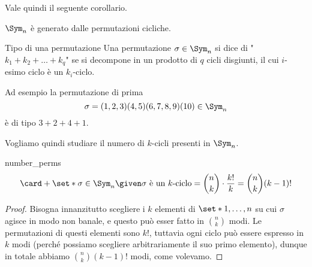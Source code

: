 Vale quindi il seguente corollario.

\begin{corollary}{}{}
    $\Sym_n$ è generato dalle permutazioni cicliche.
\end{corollary}


\begin{definition}
    {Tipo di una permutazione}{}
    Una permutazione $\sigma \in \Sym_n$ si dice di  "$k_1 + k_2 + \dots + k_q$" se si decompone in un prodotto di $q$ cicli disgiunti, il cui $i$-esimo ciclo è un $k_i$-ciclo. 
\end{definition}

Ad esempio la permutazione di prima \[
    \sigma = (1, 2, 3)(4, 5)(6, 7, 8, 9)(10) \in \Sym_n
\] è di tipo $3 + 2 + 4 + 1$.

Vogliamo quindi studiare il numero di $k$-cicli presenti in $\Sym_n$.

\begin{proposition}
    {}{number_perms}
    \[
        \card+{\set*{\sigma \in \Sym_n \given \sigma \text{ è un $k$-ciclo}}} = \binom{n}{k} \cdot \frac{k!}{k} = \binom{n}{k}(k-1)!
    \]
\end{proposition}
\begin{proof}
    Bisogna innanzitutto scegliere i $k$ elementi di $\set*{1, \dots, n}$ su cui $\sigma$ agisce in modo non banale, e questo può esser fatto in $\binom{n}{k}$ modi. Le permutazioni di questi elementi sono $k!$, tuttavia ogni ciclo può essere espresso in $k$ modi (perché possiamo scegliere arbitrariamente il suo primo elemento), dunque in totale abbiamo $\binom{n}{k}(k-1)!$ modi, come volevamo.   
\end{proof}

